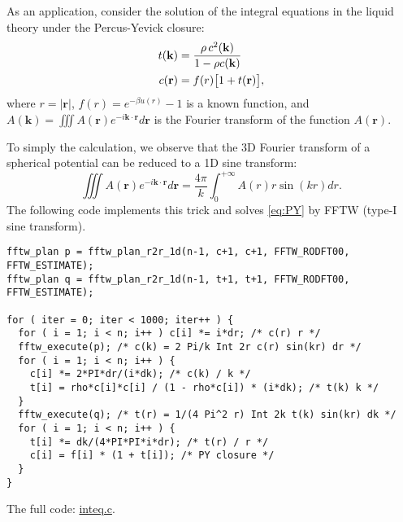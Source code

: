 \documentclass[12pt]{article}
\newcommand{\vct}[1]{\mathbf{#1}}
\begin{document}
As an application, consider the solution of
  the integral equations in the liquid theory
  under the Percus-Yevick closure:
\begin{align}
  t(\vct{k}) &= \frac{ \rho \, c^2(\vct{k}) } { 1 - \rho c(\vct{k}) } \notag \\
  c(\vct{r}) &= f(r) \big[1 + t(\vct{r})\big],
  \label{eq:PY}
\end{align}
%
where $r = |\vct{r}|$, $f(r) = e^{-\beta u(r)} - 1$ is a known function,
 and $A(\vct{k}) = \iiint A(\vct{r}) e^{-i\vct{k}\cdot\vct{r}} d\vct{r}$
 is the Fourier transform of the function $A(\vct{r})$.

To simply the calculation, we observe that
  the 3D Fourier transform of a spherical potential
  can be reduced to a 1D sine transform:
\begin{equation}
  \iiint A(\vct{r}) e^{-i\vct{k}\cdot\vct{r}} d\vct{r}
  = \frac{4\pi}{k} \int_0^{+\infty} A(r) r \sin(kr) dr.
\end{equation}
%
The following code implements this trick
  and solves \eqref{eq:PY} by FFTW (type-I sine transform).
%
{\footnotesize
\begin{verbatim}
fftw_plan p = fftw_plan_r2r_1d(n-1, c+1, c+1, FFTW_RODFT00, FFTW_ESTIMATE);
fftw_plan q = fftw_plan_r2r_1d(n-1, t+1, t+1, FFTW_RODFT00, FFTW_ESTIMATE);

for ( iter = 0; iter < 1000; iter++ ) {
  for ( i = 1; i < n; i++ ) c[i] *= i*dr; /* c(r) r */
  fftw_execute(p); /* c(k) = 2 Pi/k Int 2r c(r) sin(kr) dr */
  for ( i = 1; i < n; i++ ) {
    c[i] *= 2*PI*dr/(i*dk); /* c(k) / k */
    t[i] = rho*c[i]*c[i] / (1 - rho*c[i]) * (i*dk); /* t(k) k */
  }
  fftw_execute(q); /* t(r) = 1/(4 Pi^2 r) Int 2k t(k) sin(kr) dk */
  for ( i = 1; i < n; i++ ) {
    t[i] *= dk/(4*PI*PI*i*dr); /* t(r) / r */
    c[i] = f[i] * (1 + t[i]); /* PY closure */
  }
}
\end{verbatim}
}
%
The full code: \url{inteq.c}.
\end{document}
